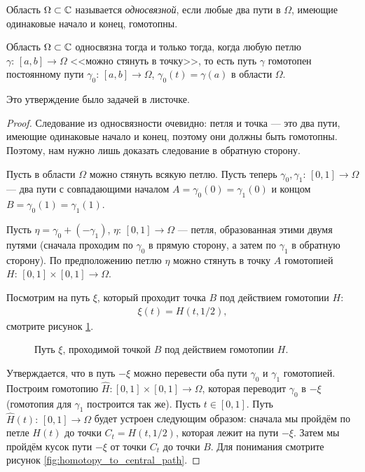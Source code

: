 \documentclass[../complex-analysis.tex]{subfiles}
\begin{document}
\begin{df}
 Область $ \Omega \subset\mathbb{C} $ называется \emph{односвязной}, если любые два пути в $ \Omega $, имеющие одинаковые начало и конец, гомотопны.
\end{df}

\begin{claim}
 Область $ \Omega \subset \mathbb{C} $ односвязна тогда и только тогда, когда любую петлю $ \gamma \colon\,[a,b] \to \Omega $ <<можно стянуть в точку>>, то есть путь $ \gamma $ гомотопен постоянному пути $ \gamma_0 \colon\,[a,b] \to \Omega $, $ \gamma_0(t) = \gamma(a) $ в области $ \Omega $.
\end{claim}

Это утверждение было задачей в листочке.

\begin{proof}
 Следование из односвязности очевидно: петля и точка --- это два пути, имеющие одинаковые начало и конец, поэтому они должны быть гомотопны. Поэтому, нам нужно лишь доказать следование в обратную сторону.

 Пусть в области $ \Omega $ можно стянуть всякую петлю. Пусть теперь $ \gamma_0, \gamma_1 \colon\, [0,1] \to \Omega $ --- два пути с совпадающими началом $ A = \gamma_0(0) = \gamma_1(0) $ и концом $ B = \gamma_0(1) = \gamma_1(1) $.

 Пусть $ \eta = \gamma_0 + (-\gamma_1)$, $ \eta \colon\, [0,1] \to \Omega $ --- петля, образованная этими двумя путями (сначала проходим по $ \gamma_0 $ в прямую сторону, а затем по $ \gamma_1 $ в обратную сторону). По предположению петлю $ \eta $ можно стянуть в точку $ A $ гомотопией $ H \colon\, [0,1] \times [0,1] \to \Omega $.

 Посмотрим на путь $ \xi $, который проходит точка $ B $ под действием гомотопии $ H $:
 \begin{align*}
  \xi(t) = H(t, 1 / 2),
 \end{align*} смотрите рисунок \ref{fig:central-path}.
 \begin{figure}[ht]
  \centering
  \caption{Путь $ \xi $, проходимой точкой $ B $ под действием гомотопии $ H $.}
  \label{fig:central-path}
 \end{figure}

 Утверждается, что в путь $ -\xi $ можно перевести оба пути $ \gamma_0 $ и $ \gamma_1 $ гомотопией. Построим гомотопию $ \hat H \colon [0,1] \times [0,1] \to \Omega $, которая переводит $ \gamma_0 $ в $ -\xi $ (гомотопия для $ \gamma_1 $ построится так же). Пусть $ t \in [0, 1] $. Путь $ \hat H(t) \colon\, [0,1] \to \Omega $ будет устроен следующим образом: сначала мы пройдём по петле $ H(t) $ до точки $ C_t = H(t, 1 / 2) $, которая лежит на пути $ -\xi $. Затем мы пройдём кусок пути $ -\xi $ от точки $ C_t $ до точки $ B $. Для понимания смотрите рисунок \ref{fig:homotopy_to_central_path}.


\end{proof}
\end{document}
